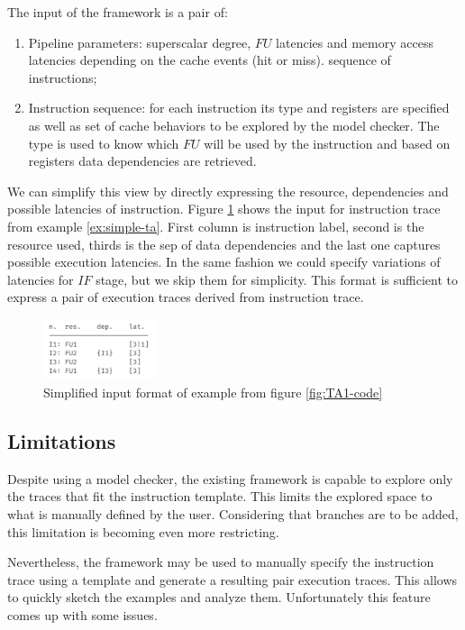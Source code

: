 The input of the framework is a pair of:
\begin{enumerate}
	\item Pipeline parameters: superscalar degree, $FU$ latencies and memory access latencies depending on the cache events (hit or miss). sequence of instructions;
	\item Instruction sequence: for each instruction its type and registers are specified as well as set of cache behaviors to be explored by the model checker. The type is used to know which $FU$ will be used by the instruction and based on registers data dependencies are retrieved.
\end{enumerate}

We can simplify this view by directly expressing the resource, dependencies and possible latencies of instruction. Figure \ref{fig:input-format} shows the input for instruction trace from example \ref{ex:simple-ta}. First column is instruction label, second is the resource used, thirds is the sep of data dependencies and the last one captures possible execution latencies. In the same fashion we could specify variations of latencies for $IF$ stage, but we skip them for simplicity. This format is sufficient to express a pair of execution traces derived from instruction trace.


\begin{figure}[htbp]
	\centering
	\includegraphics[width=0.3\textwidth]{figures/input_ex.png}
	\caption{Simplified input format of example from figure \ref{fig:TA1-code}}
	\label{fig:input-format}
\end{figure}

\subsection{Limitations}

Despite using a model checker, the existing framework is capable to explore only the traces that fit the instruction template. This limits the explored space to what is manually defined by the user. Considering that branches are to be added, this limitation is becoming even more restricting. 

Nevertheless, the framework may be used to manually specify the instruction trace using a template and generate a resulting pair execution traces. This allows to quickly sketch the examples and analyze them. Unfortunately this feature comes up with some issues.

